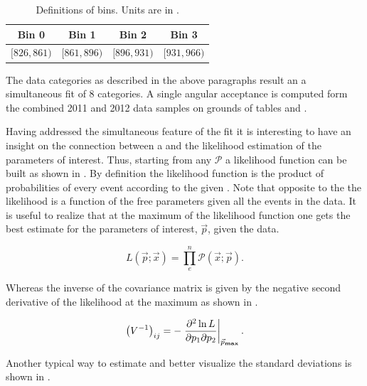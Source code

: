 \begin{table}[!h]
\centering
\begin{tabular}{c c c c}
  \hline
  Bin 0 & Bin 1 & Bin 2 & Bin 3\\
  \hline
  $ [826,861) $ & $ [861,896) $ & $ [896,931) $ & $ [931,966) $ \\
  \hline
\end{tabular}
\caption{Definitions of \mkpi bins. Units are in \mevcc.}
\label{Kbindef}
\end{table}

The data categories as described in the above paragraphs result an a simultaneous fit of 8 categories.
A single angular acceptance is computed form the combined 2011 and 2012 data samples on grounds of tables  and .


Having addressed the simultaneous feature of the fit it is interesting to have an insight on
the connection between a \pdf and the likelihood estimation of the parameters of interest. Thus, starting from
any \pdf $\mathcal{P}$ a likelihood function can be built as shown in . By definition the likelihood
function is the product of probabilities of every event according to the given \pdf. Note that opposite to the \pdf
the likelihood is a function of the free parameters given all the events in the data. It is
useful to realize that at the maximum of the likelihood function one gets the best estimate for the parameters of
interest, $\vec{p}$, given the data.

\begin{equation}
L(\vec{p};\vec{x}) = \prod_e^n \mathcal{P}(\vec{x};\vec{p}).
\label{likelihood}
\end{equation}

\noindent Whereas the inverse of the covariance matrix is given by the negative second derivative of the likelihood at the maximum as shown in .

\begin{equation}
\left( V^{-1} \right)_{ij} = - \left. \frac{\partial^2\ln L}{\partial p_1 \partial p_2} \right|_{ \vec{p}_{\rm\bf max}}.
\label{covariance}
\end{equation}

\noindent Another typical way to estimate and better visualize the standard deviations is shown in .

